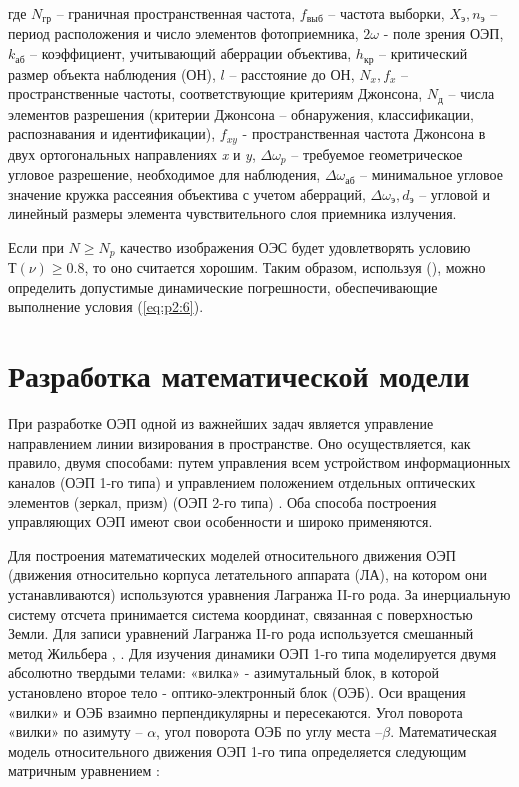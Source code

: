 где 
$N_{\textit{гр}}$ – граничная пространственная частота, 
$f_{\textit{выб}}$ – частота выборки, 
$X_{\textit{э}} ,n_{\textit{э}}$ –период расположения и число элементов фотоприемника, 
$2\omega$ - поле зрения ОЭП, 
$k_{\textit{аб}}$ – коэффициент, учитывающий аберрации объектива, 
$h_{\textit{кр}}$ – критический размер объекта наблюдения (ОН), 
$l$ – расстояние до ОН, 
$N_{x} , f_{x}$ – пространственные частоты, соответствующие критериям Джонсона, 
$N_{\textit{д}}$ – числа элементов разрешения (критерии Джонсона – обнаружения, классификации, распознавания и идентификации), 
$f_{xy}$ - пространственная частота Джонсона в двух ортогональных направлениях \textit{x} и \textit{y}, 
$\Delta{}{\omega{}}_p$ – требуемое геометрическое угловое разрешение, необходимое для наблюдения, 
$\Delta{}{\omega{}}_{\textit{аб}}$ – минимальное угловое значение кружка рассеяния объектива с учетом аберраций, 
$\Delta{}{\omega{}}_{\textit{э}} , d_{\textit{э}}$ – угловой и линейный размеры элемента чувствительного слоя приемника излучения. 

Если при $N \ge N_p$ качество изображения ОЭС будет удовлетворять условию $Т(\nu) \ge 0.8$, то оно считается хорошим. Таким образом, используя (), можно определить допустимые динамические погрешности, обеспечивающие выполнение условия (\ref{eq:p2:6}).

\section{Разработка математической модели} \label{sec:ch2/sec3}

При разработке ОЭП одной из важнейших задач является управление направлением линии визирования в пространстве. Оно осуществляется, как правило, двумя способами: путем управления всем устройством информационных каналов (ОЭП 1-го типа) и управлением положением отдельных оптических элементов (зеркал, призм) (ОЭП 2-го типа) \cite[]{Karpov23}. Оба способа построения управляющих ОЭП имеют свои особенности и широко применяются.

Для построения математических моделей относительного движения ОЭП (движения относительно корпуса летательного аппарата (ЛА), на котором они устанавливаются) используются уравнения Лагранжа II-го рода. За инерциальную систему отсчета принимается система координат, связанная с поверхностью Земли. Для записи уравнений Лагранжа II-го рода используется смешанный метод Жильбера \cite[]{Belyakov}, \cite[]{Baloev16}. Для изучения динамики ОЭП 1-го типа моделируется двумя абсолютно твердыми телами: «вилка» - азимутальный блок, в которой установлено второе тело - оптико-электронный блок (ОЭБ). Оси вращения «вилки» и ОЭБ взаимно перпендикулярны и пересекаются. Угол поворота «вилки» по азимуту – $\alpha$, угол поворота ОЭБ по углу места –$\beta$. Математическая модель относительного движения ОЭП 1-го типа определяется следующим матричным уравнением \cite[]{Karpov23}:

